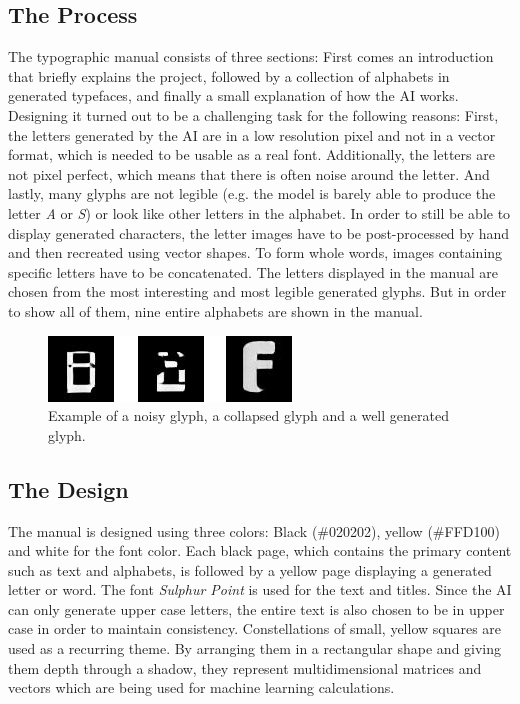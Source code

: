 \documentclass[11pt]{article}
\begin{document}
\subsection{The Process}
The typographic manual consists of three sections: First comes an introduction that briefly explains the project, followed by a collection of alphabets in generated typefaces, and finally a small explanation of how the AI works.
Designing it turned out to be a challenging task for the following reasons: First, the letters generated by the AI are in a low resolution pixel and not in a vector format, which is needed to be usable as a real font. Additionally, the letters are not pixel perfect, which means that there is often noise around the letter. And lastly, many glyphs are not legible (e.g. the model is barely able to produce the letter \emph{A} or \emph{S}) or look like other letters in the alphabet.
In order to still be able to display generated characters, the letter images have to be post-processed by hand and then recreated using vector shapes. To form whole words, images containing specific letters have to be concatenated. The letters displayed in the manual are chosen from the most interesting and most legible generated glyphs. But in order to show all of them, nine entire alphabets are shown in the manual.

\begin{figure}
    \centering
    \includegraphics[width=0.5\columnwidth]{examples.png}
    \caption{Example of a noisy glyph, a collapsed glyph and a well generated glyph.}
    \label{fig:examples}
\end{figure}

\subsection{The Design}
The manual is designed using three colors: Black (\textcolor{blackColor}{\#020202}), yellow (\textcolor{yellowColor}{\#FFD100}) and white for the font color. Each black page, which contains the primary content such as text and alphabets, is followed by a yellow page displaying a generated letter or word. The font \emph{Sulphur Point} is used for the text and titles. Since the AI can only generate upper case letters, the entire text is also chosen to be in upper case in order to maintain consistency.
Constellations of small, yellow squares are used as a recurring theme. By arranging them in a rectangular shape and giving them depth through a shadow, they represent multidimensional matrices and vectors which are being used for machine learning calculations.
\end{document}
